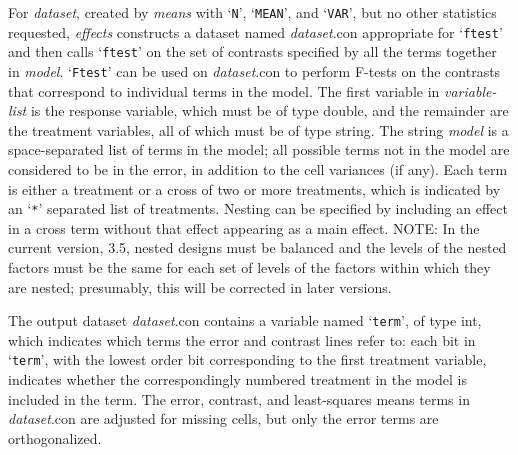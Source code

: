 \documentclass{book}
\newcommand\Texinfocommandstyletextvar[1]{{\normalfont{}\textsl{#1}}}%
\renewcommand{\_}{\Texinfounderscore\discretionary{}{}{}}
\begin{document}
For \Texinfocommandstyletextvar{dataset}, created by \Texinfocommandstyletextvar{means} with `\texttt{N}', `\texttt{MEAN}', and `\texttt{VAR}',
but no other statistics requested, \Texinfocommandstyletextvar{effects} constructs a dataset named
\Texinfocommandstyletextvar{dataset}.con appropriate for `\texttt{ftest}' and then calls `\texttt{ftest}'
on the set of contrasts
%
specified by all the terms together in \Texinfocommandstyletextvar{model}.
`\texttt{Ftest}'
%
can be used on \Texinfocommandstyletextvar{dataset}.con
to perform F-tests on the contrasts that correspond to individual
terms in the model.
The first variable in \Texinfocommandstyletextvar{variable-list}
is the response variable, which must be of type double,
and the remainder are the treatment variables, all of which must be of type string.
The string \Texinfocommandstyletextvar{model}
%
is a space-separated list of terms in the model; all
possible terms not in the model are considered to be in
the error, in addition to the cell variances (if any).
Each term is either a treatment or a cross of two or more
treatments, which is indicated by an `\texttt{*}' separated list of treatments.
Nesting
%
can be specified by including an effect in a cross
term without that effect appearing as a main effect.
NOTE:
%
%
In the current version, 3.5, nested designs must be balanced and the
levels of the nested factors must be the same for each set of levels
of the factors within which they are nested; presumably,
this will be corrected in later versions.

The output dataset \Texinfocommandstyletextvar{dataset}.con contains a variable named `\texttt{\_term\_}',
\index[in]{\_term\_@\_term\_}%
of type int, which indicates which terms the error and contrast lines refer to:
each bit in `\texttt{\_term\_}', with the lowest order bit corresponding to the
first treatment variable,
indicates whether the correspondingly numbered treatment in the model
is included in the term.
The error, contrast, and least-squares means terms in
\Texinfocommandstyletextvar{dataset}.con are adjusted for missing cells, but only the error
terms are orthogonalized.
\end{document}
